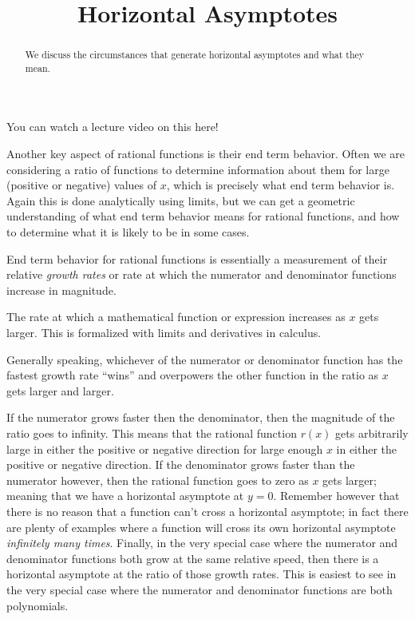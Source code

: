 \documentclass{ximera}
\title{Horizontal Asymptotes}
\begin{document}
\begin{abstract}
    We discuss the circumstances that generate horizontal asymptotes and what they mean.
\end{abstract}
\maketitle

You can watch a lecture video on this here!


Another key aspect of rational functions is their end term behavior. Often we are considering a ratio of functions to determine information about them for large (positive or negative) values of $x$, which is precisely what end term behavior is. Again this is done analytically using limits, but we can get a geometric understanding of what end term behavior means for rational functions, and how to determine what it is likely to be in some cases.

End term behavior for rational functions is essentially a measurement of their relative \textit{growth rates} or rate at which the numerator and denominator functions increase in magnitude.

\begin{definition}
    The rate at which a mathematical function or expression increases as $x$ gets larger. This is formalized with limits and derivatives in calculus.
\end{definition}

Generally speaking, whichever of the numerator or denominator function has the fastest growth rate ``wins'' and overpowers the other function in the ratio as $x$ gets larger and larger. 

If the numerator grows faster then the denominator, then the magnitude of the ratio goes to infinity. This means that the rational function $r(x)$ gets arbitrarily large in either the positive or negative direction for large enough $x$ in either the positive or negative direction. 
If the denominator grows faster than the numerator however, then the rational function goes to zero as $x$ gets larger; meaning that we have a horizontal asymptote at $y=0$. Remember however that there is no reason that a function can't cross a horizontal asymptote; in fact there are plenty of examples where a function will cross its own horizontal asymptote \textit{infinitely many times}. 
Finally, in the very special case where the numerator and denominator functions both grow at the same relative speed, then there is a horizontal asymptote at the ratio of those growth rates. This is easiest to see in the very special case where the numerator and denominator functions are both polynomials.
\end{document}
